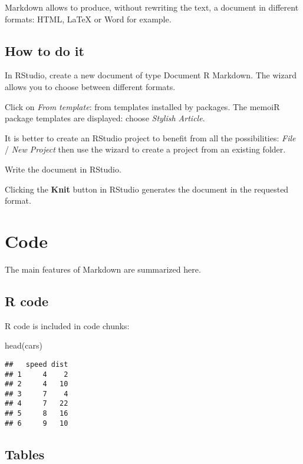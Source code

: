 \documentclass[fleqn,10pt]{latex/stylish_article} %
\newenvironment{Shaded}{\begin{snugshade}}{\end{snugshade}}
\newcommand{\FunctionTok}[1]{\textcolor[rgb]{0.00,0.00,0.00}{{#1}}}
\newcommand{\NormalTok}[1]{{#1}}
\begin{document}
Markdown allows to produce, without rewriting the text, a document in different formats: HTML, LaTeX or Word for example.

\subsection{How to do it}\label{how-to-do-it}

In RStudio, create a new document of type Document R Markdown.
The wizard allows you to choose between different formats.

Click on \emph{From template}: from templates installed by packages.
The memoiR package templates are displayed: choose \emph{Stylish Article}.

It is better to create an RStudio project to benefit from all the possibilities: \emph{File} / \emph{New Project} then use the wizard to create a project from an existing folder.

Write the document in RStudio.

Clicking the \textbf{Knit} button in RStudio generates the document in the requested format.

\section{Code}\label{code}

The main features of Markdown are summarized here.

\subsection{R code}\label{r-code}

R code is included in code chunks:

\scriptsize

\begin{Shaded}
\begin{Highlighting}[]
\FunctionTok{head}\NormalTok{(cars)}
\end{Highlighting}
\end{Shaded}

\begin{verbatim}
##   speed dist
## 1     4    2
## 2     4   10
## 3     7    4
## 4     7   22
## 5     8   16
## 6     9   10
\end{verbatim}

\normalsize

\subsection{Tables}\label{tables}
\end{document}
